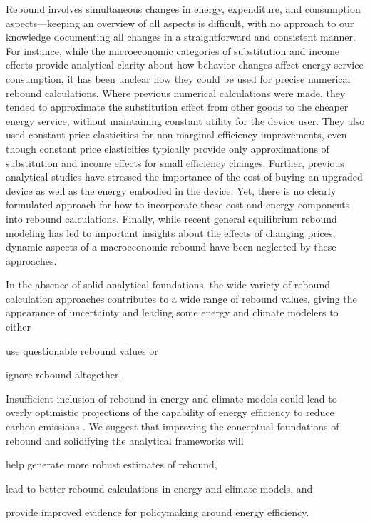 \documentclass[12pt]{article}\usepackage[]{graphicx}\usepackage[]{xcolor}
\begin{document}
Rebound involves simultaneous changes in energy, expenditure,
and consumption aspects---keeping an overview of all
aspects is difficult, with no approach to our knowledge documenting all 
changes in a straightforward and consistent manner.
For instance, while the microeconomic categories of substitution and
income effects provide analytical clarity about how behavior
changes affect energy service consumption,
it has been unclear how they could be used 
for precise numerical rebound calculations. 
Where previous numerical calculations were made, 
they tended to approximate the substitution effect
from other goods to the cheaper energy service, 
without maintaining constant utility for the device user.
They also used constant price elasticities
for non-marginal efficiency improvements,
even though constant price elasticities typically
provide only approximations of substitution and
income effects for small efficiency changes.
Further, previous analytical studies have stressed the importance of the
cost of buying an upgraded device as well as the energy embodied in the device.
Yet, there is no clearly formulated approach for how to incorporate these 
cost and energy components into rebound calculations. 
Finally, while recent general equilibrium rebound modeling has led to 
important insights about the effects of changing prices,
dynamic aspects of a macroeconomic rebound have
been neglected by these approaches.

In the absence of solid analytical foundations, 
the wide variety of rebound calculation approaches 
contributes to a wide range of rebound values, 
giving the appearance of uncertainty and
leading some energy and climate modelers to either 
%
\begin{enumerate*}[label={(\roman*)}]

  \item use questionable rebound values or 
  
  \item ignore rebound altogether.

\end{enumerate*}
%
Insufficient inclusion of rebound in energy and climate models
could lead to overly optimistic projections
of the capability of energy efficiency 
to reduce carbon emissions \citep{Brockway:2021ww}. 
We suggest that 
improving the conceptual foundations of rebound and
solidifying the analytical frameworks
will
%
\begin{enumerate*}[label={(\roman*)}]

  \item help generate more robust estimates of rebound,
  
  \item lead to better rebound calculations 
        in energy and climate models, and 
  
  \item provide improved evidence 
        for policymaking around energy efficiency. 

\end{enumerate*}
\end{document}
